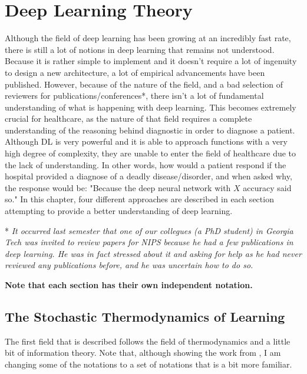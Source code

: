 \chapter{Deep Learning Theory}

Although the field of deep learning has been growing at an incredibly fast rate, there is still a lot of notions in deep learning that remains not understood. Because it is rather simple to implement and it doesn't require a lot of ingenuity to design a new architecture, a lot of empirical advancements have been published. However, because of the nature of the field, and a bad selection of reviewers for publications/conferences*, there isn't a lot of fundamental understanding of what is happening with deep learning. This becomes extremely crucial for healthcare, as the nature of that field requires a complete understanding of the reasoning behind diagnostic in order to diagnose a patient. Although DL is very powerful and it is able to approach functions with a very high degree of complexity, they are unable to enter the field of healthcare due to the lack of understanding. In other words, how would a patient respond if the hospital provided a diagnose of a deadly disease/disorder, and when asked why, the response would be: "Because the deep neural network with $X$ accuracy said so." In this chapter, four different approaches are described in each section attempting to provide a better understanding of deep learning.

* \textit{It occurred last semester that one of our collegues (a PhD student) in Georgia Tech was invited to review papers for NIPS because he had a few publications in deep learning. He was in fact stressed about it and asking for help as he had never reviewed any publications before, and he was uncertain how to do so.}

\textbf{Note that each section has their own independent notation.}

\section{The Stochastic Thermodynamics of Learning \cite{thermo}}
The first field that is described follows the field of thermodynamics and a little bit of information theory. Note that, although showing the work from \cite{thermo}, I am changing some of the notations to a set of notations that is a bit more familiar.

